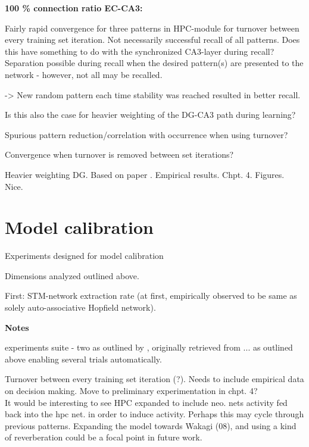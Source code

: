 \textbf{100 \% connection ratio EC-CA3:}

Fairly rapid convergence for three patterns in HPC-module for turnover between every training set iteration. 
Not necessarily successful recall of all patterns. Does this have something to do with the synchronized CA3-layer during recall? Separation possible during recall when the desired pattern(s) are presented to the network - however, not all may be recalled.

-> New random pattern each time stability was reached resulted in better recall.

Is this also the case for heavier weighting of the DG-CA3 path during learning?

Spurious pattern reduction/correlation with occurrence when using turnover?

Convergence when turnover is removed between set iterations?

Heavier weighting DG. Based on paper \citep{Norman2003}. Empirical results. Chpt. 4. Figures. Nice.

\section*{Model calibration}

Experiments designed for model calibration

Dimensions analyzed outlined above.

First: STM-network extraction rate (at first, empirically observed to be same as solely auto-associative Hopfield network).


\textbf{Notes}

experiments suite - two as outlined by \citep{Hattori2014}, originally retrieved from ... as outlined above
enabling several trials automatically.

Turnover between every training set iteration (?). Needs to include empirical data on decision making. Move to preliminary experimentation in chpt. 4?
\\

It would be interesting to see HPC expanded to include neo. nets activity fed back into the hpc net. in order to induce activity. Perhaps this may cycle through previous patterns. Expanding the model towards Wakagi (08), and using a kind of reverberation could be a focal point in future work.


\cleardoublepage